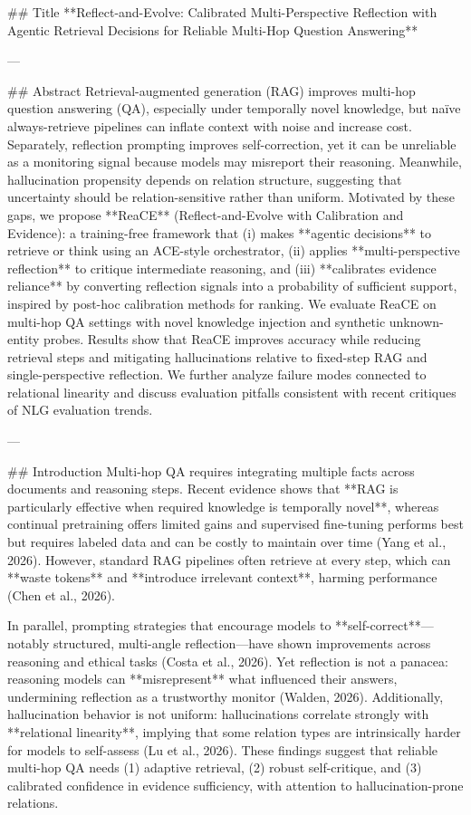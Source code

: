 ## Title  
**Reflect-and-Evolve: Calibrated Multi-Perspective Reflection with Agentic Retrieval Decisions for Reliable Multi-Hop Question Answering**

---

## Abstract  
Retrieval-augmented generation (RAG) improves multi-hop question answering (QA), especially under temporally novel knowledge, but naïve always-retrieve pipelines can inflate context with noise and increase cost. Separately, reflection prompting improves self-correction, yet it can be unreliable as a monitoring signal because models may misreport their reasoning. Meanwhile, hallucination propensity depends on relation structure, suggesting that uncertainty should be relation-sensitive rather than uniform. Motivated by these gaps, we propose **ReaCE** (Reflect-and-Evolve with Calibration and Evidence): a training-free framework that (i) makes **agentic decisions** to retrieve or think using an ACE-style orchestrator, (ii) applies **multi-perspective reflection** to critique intermediate reasoning, and (iii) **calibrates evidence reliance** by converting reflection signals into a probability of sufficient support, inspired by post-hoc calibration methods for ranking. We evaluate ReaCE on multi-hop QA settings with novel knowledge injection and synthetic unknown-entity probes. Results show that ReaCE improves accuracy while reducing retrieval steps and mitigating hallucinations relative to fixed-step RAG and single-perspective reflection. We further analyze failure modes connected to relational linearity and discuss evaluation pitfalls consistent with recent critiques of NLG evaluation trends.

---

## Introduction  
Multi-hop QA requires integrating multiple facts across documents and reasoning steps. Recent evidence shows that **RAG is particularly effective when required knowledge is temporally novel**, whereas continual pretraining offers limited gains and supervised fine-tuning performs best but requires labeled data and can be costly to maintain over time (Yang et al., 2026). However, standard RAG pipelines often retrieve at every step, which can **waste tokens** and **introduce irrelevant context**, harming performance (Chen et al., 2026).

In parallel, prompting strategies that encourage models to **self-correct**—notably structured, multi-angle reflection—have shown improvements across reasoning and ethical tasks (Costa et al., 2026). Yet reflection is not a panacea: reasoning models can **misrepresent** what influenced their answers, undermining reflection as a trustworthy monitor (Walden, 2026). Additionally, hallucination behavior is not uniform: hallucinations correlate strongly with **relational linearity**, implying that some relation types are intrinsically harder for models to self-assess (Lu et al., 2026). These findings suggest that reliable multi-hop QA needs (1) adaptive retrieval, (2) robust self-critique, and (3) calibrated confidence in evidence sufficiency, with attention to hallucination-prone relations.

